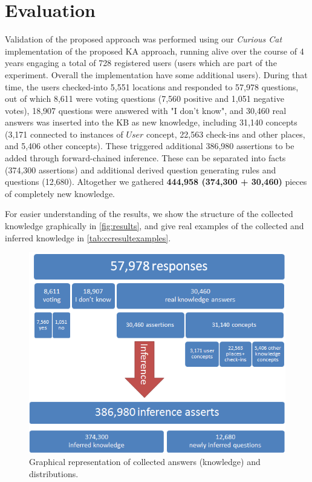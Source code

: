 % 
\chapter{Evaluation}
\label{chapter:evaluation}

Validation of the proposed approach was performed using our \emph{Curious Cat}
implementation of the proposed KA approach, running alive over the course of 4 
years engaging a total of 728 registered 
users (users which are part of the experiment. Overall the implementation have
some additional users). During that time, the users checked-into 5,551 locations
and responded 
to 57,978 questions, out of which 8,611 were voting questions (7,560 positive 
and 1,051 negative votes), 18,907 questions were answered with "I don't know", 
and 30,460 real answers was inserted into the KB as new knowledge, including 
31,140 concepts (3,171 connected to instances of $User$ concept, 22,563 
check-ins and other places, and 5,406 other concepts). 
These triggered additional 386,980 assertions to be added through 
forward-chained inference. These can be separated into facts (374,300 
assertions) and additional derived question generating rules and questions 
(12,680). Altogether we gathered \textbf{444,958 (374,300 + 30,460)} pieces of 
completely new knowledge. 

For easier understanding of the results, we show the structure of the collected
knowledge 
graphically in \autoref{fig:results}, and give real examples of the collected 
and inferred knowledge in \autoref{tab:ccresultexamples}.

\begin{figure}[h]
	\centering
		\includegraphics[width=1\textwidth]{figures/results.png}
	\caption{Graphical representation of collected answers (knowledge) and 
    distributions.}
	\label{fig:results}
\end{figure}

